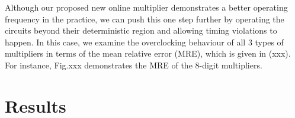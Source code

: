 \documentclass[conference]{IEEEtran}
\begin{document}
Although our proposed new online multiplier demonstrates a better operating frequency in the practice, we can push this one step further by operating the circuits beyond their deterministic region and allowing timing violations to happen. In this case, we examine the overclocking behaviour of all 3 types of multipliers in terms of the mean relative error (MRE), which is given in (xxx). For instance, Fig.xxx demonstrates the MRE of the 8-digit multipliers. 


\section{Results}





%
%


%
\end{document}
